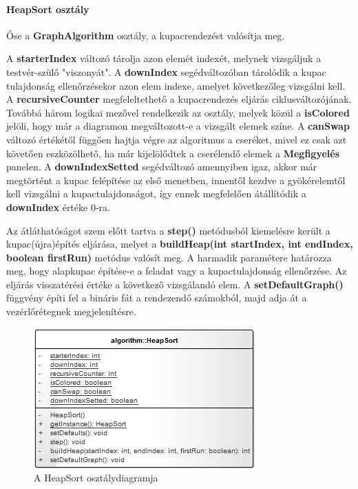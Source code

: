 \documentclass{elteikthesis}
\begin{document}
\paragraph{HeapSort osztály}
Őse a \textbf{GraphAlgorithm} osztály, a kupacrendezést valósítja meg.\par
A \textbf{starterIndex} változó tárolja azon elemét indexét, melynek vizsgáljuk a testvér-szülő "viszonyát". A \textbf{downIndex} segédváltozóban tárolódik a kupac tulajdonság ellenőrzésekor azon elem indexe, amelyet következőleg vizsgálni kell. A \textbf{recursiveCounter} megfeleltethető a kupacrendezés eljárás ciklusváltozójának. Továbbá három logikai mezővel rendelkezik az osztály, melyek közül a \textbf{isColored} jelöli, hogy már a diagramon megváltozott-e a vizsgált elemek színe. A \textbf{canSwap} változó értékétől függően hajtja végre az algoritmus a cseréket, mivel ez csak azt követően eszközölhető, ha már kijelölődtek a cserélendő elemek a \textbf{Megfigyelés} panelen. A \textbf{downIndexSetted} segédváltozó amennyiben igaz, akkor már megtörtént a kupac felépítése az első menetben, innentől kezdve a gyökérelemtől kell vizsgálni a kupactulajdonságot, így ennek megfelelően átállítódik a \textbf{downIndex} értéke 0-ra.\par
Az átláthatóságot szem előtt tartva a \textbf{step()} metódusból kiemelésre került a kupac(újra)építés eljárása, melyet a \textbf{buildHeap(int startIndex, int endIndex, boolean firstRun)} metódus valósít meg. A harmadik paramétere határozza meg, hogy alapkupac építése-e a feladat vagy a kupactulajdonság ellenőrzése. Az eljárás visszatérési értéke a következő vizsgálandó elem. A \textbf{setDefaultGraph()} függvény építi fel a bináris fát a rendezendő számokból, majd adja át a vezérlőrétegnek megjelenítésre.
\begin{figure}[H]
	\centering
	\includegraphics{pics/class/HeapSort.png}
	\caption{A HeapSort osztálydiagramja}
\end{figure}
\end{document}
